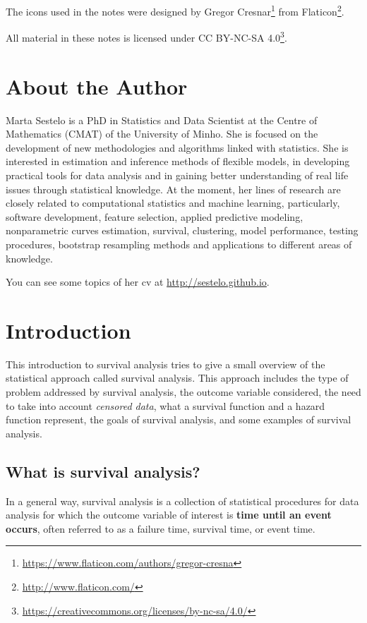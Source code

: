 \documentclass[]{book}
\let\rmarkdownfootnote\footnote%
\def\footnote{\protect\rmarkdownfootnote}
\renewcommand{\href}[2]{#2\footnote{\url{#1}}}
\theoremstyle{definition}
\theoremstyle{definition}
\theoremstyle{definition}
\theoremstyle{remark}
\begin{document}
The icons used in the notes were designed by
\href{https://www.flaticon.com/authors/gregor-cresna}{Gregor Cresnar}
from \href{http://www.flaticon.com/}{Flaticon}.

All material in these notes is licensed under
\href{https://creativecommons.org/licenses/by-nc-sa/4.0/}{CC BY-NC-SA
4.0}.

\chapter*{About the Author}\label{about-the-author}

Marta Sestelo is a PhD in Statistics and Data Scientist at the Centre of
Mathematics (CMAT) of the University of Minho. She is focused on the
development of new methodologies and algorithms linked with statistics.
She is interested in estimation and inference methods of flexible
models, in developing practical tools for data analysis and in gaining
better understanding of real life issues through statistical knowledge.
At the moment, her lines of research are closely related to
computational statistics and machine learning, particularly, software
development, feature selection, applied predictive modeling,
nonparametric curves estimation, survival, clustering, model
performance, testing procedures, bootstrap resampling methods and
applications to different areas of knowledge.

You can see some topics of her cv at \url{http://sestelo.github.io}.

\chapter{Introduction}\label{intro}

This introduction to survival analysis tries to give a small overview of
the statistical approach called survival analysis. This approach
includes the type of problem addressed by survival analysis, the outcome
variable considered, the need to take into account \emph{censored data},
what a survival function and a hazard function represent, the goals of
survival analysis, and some examples of survival analysis.

\section{What is survival analysis?}\label{intro-what}

In a general way, survival analysis is a collection of statistical
procedures for data analysis for which the outcome variable of interest
is \textbf{time until an event occurs}, often referred to as a failure
time, survival time, or event time.
\end{document}
